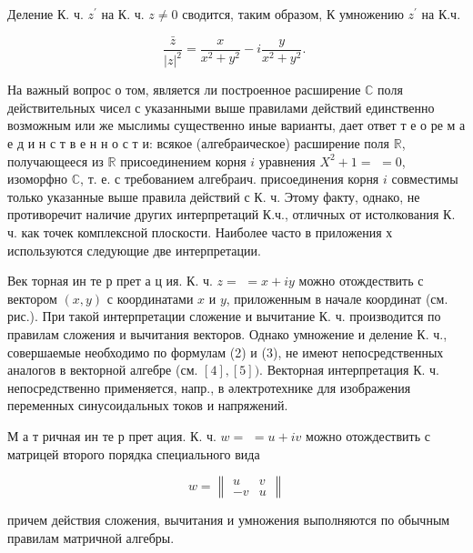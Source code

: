 \documentclass[10pt]{article}
\begin{document}
Деление К. ч. $z^{\prime}$ на К. ч. $z \neq 0$ сводится, таким образом, К умножению $z^{\prime}$ на К.ч.



\[

\frac{\bar{z}}{|z|^{2}}=\frac{x}{x^{2}+y^{2}}-i \frac{y}{x^{2}+y^{2}} \text {. }

\]



На важный вопрос о том, является ли построенное расширение $\mathbb{C}$ поля действительных чисел с указанными выше правилами действий единственно возможным или же мыслимы существенно иные варианты, дает ответ т е о ре м а е д и н с т в е н н о с т и: всякое (алгебраическое) расширение поля $\mathbb{R}$, получающееся из $\mathbb{R}$ присоединением корня $i$ уравнения $X^{2}+1=$ $=0$, изоморфно $\mathbb{C}$, т. е. с требованием алгебраич. присоединения корня $i$ совместимы только указанные выше правила действий с К. ч. Этому факту, однако, не противоречит наличие других интерпретаций К.ч., отличных от истолкования К. ч. как точек комплексной плоскости. Наиболее часто в приложения х используются следующие две интерпретации.



Век торная ин те р прет а ц ия. К. ч. $z=$ $=x+i y$ можно отождествить с вектором $(x, y)$ с координатами $x$ и $y$, приложенным в начале координат (см. рис.). При такой интерпретации сложение и вычитание К. ч. производится по правилам сложения и вычитания векторов. Однако умножение и деление К. ч., совершаемые необходимо по формулам (2) и (3), не имеют непосредственных аналогов в векторной алгебре (см. $[4],[5])$. Векторная интерпретация $К$. ч. непосредственно применяется, напр., в әлектротехнике для изображения переменных синусоидальных токов и напряжений.



М а т ричная ин те р прет ация. К. ч. $w=$ $=u+i v$ можно отождествить с матрицей второго порядка специального вида



\[

w=\left\|\begin{array}{rr}

u & v \\

-v & u

\end{array}\right\|

\]



причем действия сложения, вычитания и умножения выполняются по обычным правилам матричной алгебры.
\end{document}
